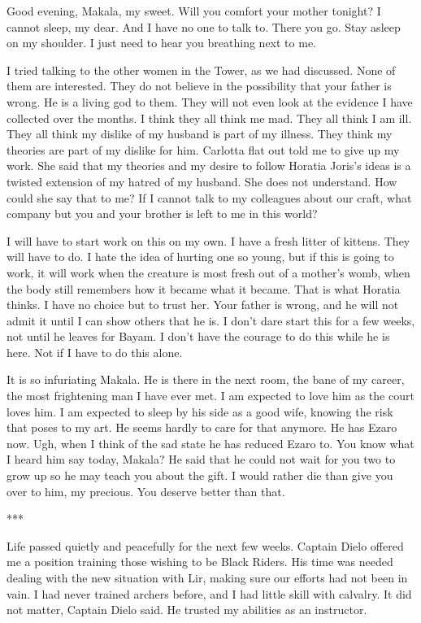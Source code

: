 \documentclass{article}
\begin{document}
Good evening, Makala, my sweet. Will you comfort your mother tonight? I cannot sleep, my dear. And I have no one to talk to. There you go. Stay asleep on my shoulder. I just need to hear you breathing next to me. 

I tried talking to the other women in the Tower, as we had discussed. None of them are interested. They do not believe in the possibility that your father is wrong. He is a living god to them. They will not even look at the evidence I have collected over the months. I think they all think me mad. They all think I am ill. They all think my dislike of my husband is part of my illness. They think my theories are part of my dislike for him. Carlotta flat out told me to give up my work. She said that my theories and my desire to follow Horatia Joris's ideas is a twisted extension of my hatred of my husband. She does not understand. How could she say that to me? If I cannot talk to my colleagues about our craft, what company but you and your brother is left to me in this world?

I will have to start work on this on my own. I have a fresh litter of kittens. They will have to do. I hate the idea of hurting one so young, but if this is going to work, it will work when the creature is most fresh out of a mother's womb, when the body still remembers how it became what it became. That is what Horatia thinks. I have no choice but to trust her. Your father is wrong, and he will not admit it until I can show others that he is. I don't dare start this for a few weeks, not until he leaves for Bayam. I don't have the courage to do this while he is here. Not if I have to do this alone.

It is so infuriating Makala. He is there in the next room, the bane of my career, the most frightening man I have ever met. I am expected to love him as the court loves him. I am expected to sleep by his side as a good wife, knowing the risk that poses to my art. He seems hardly to care for that anymore. He has Ezaro now. Ugh, when I think of the sad state he has reduced Ezaro to. You know what I heard him say today, Makala? He said that he could not wait for you two to grow up so he may teach you about the gift. I would rather die than give you over to him, my precious. You deserve better than that.

*** 

\vspace{.5 cm}

Life passed quietly and peacefully for the next few weeks. Captain Dielo offered me a position training those wishing to be Black Riders. His time was needed dealing with the new situation with Lir, making sure our efforts had not been in vain. I had never trained archers before, and I had little skill with calvalry. It did not matter, Captain Dielo said. He trusted my abilities as an instructor. 
\end{document}
